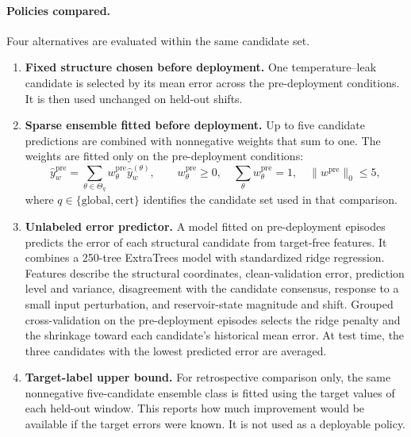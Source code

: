 \documentclass[preprint,12pt,authoryear]{elsarticle}
\begin{document}
\paragraph{Policies compared.}
Four alternatives are evaluated within the same candidate set.
\begin{enumerate}[leftmargin=*]
\item \textbf{Fixed structure chosen before deployment.} One temperature--leak candidate is selected by its mean error across the pre-deployment conditions. It is then used unchanged on held-out shifts.
\item \textbf{Sparse ensemble fitted before deployment.} Up to five candidate predictions are combined with nonnegative weights that sum to one. The weights are fitted only on the pre-deployment conditions:
\begin{equation}
  \widehat y^{\mathrm{pre}}_w
  =\sum_{\theta\in\Theta_q}w^{\mathrm{pre}}_{\theta}\widehat y^{(\theta)}_w,
  \qquad
  w^{\mathrm{pre}}_{\theta}\ge 0,
  \quad
  \sum_{\theta}w^{\mathrm{pre}}_{\theta}=1,
  \quad
  \|w^{\mathrm{pre}}\|_0\le 5,
  \label{eq:historical_sparse}
\end{equation}
where $q\in\{\mathrm{global},\mathrm{cert}\}$ identifies the candidate set used in that comparison.
\item \textbf{Unlabeled error predictor.} A model fitted on pre-deployment episodes predicts the error of each structural candidate from target-free features. It combines a 250-tree ExtraTrees model with standardized ridge regression. Features describe the structural coordinates, clean-validation error, prediction level and variance, disagreement with the candidate consensus, response to a small input perturbation, and reservoir-state magnitude and shift. Grouped cross-validation on the pre-deployment episodes selects the ridge penalty and the shrinkage toward each candidate's historical mean error. At test time, the three candidates with the lowest predicted error are averaged.
\item \textbf{Target-label upper bound.} For retrospective comparison only, the same nonnegative five-candidate ensemble class is fitted using the target values of each held-out window. This reports how much improvement would be available if the target errors were known. It is not used as a deployable policy.
\end{enumerate}
\end{document}

